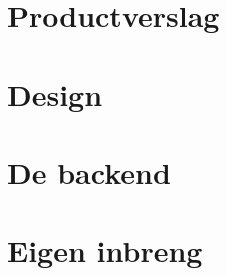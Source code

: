 \documentclass[dutch]{report}
\begin{document}
	\newpage
	
	\section{Productverslag}
	
	\section{Design}
	
	\section{De backend}
	
	\section{Eigen inbreng}
	
\end{document}
